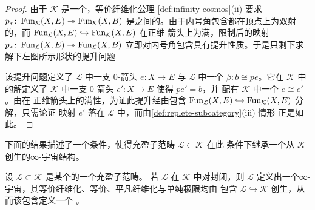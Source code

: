 \begin{proof}
由于 $\mathcal{K}$ 是一个\trInfinityCosmos{}，等价纤维化公理
\cref{def:infinity-cosmos}(ii) 要求
$p_{*}\colon\operatorname{Fun}_{\mathcal{K}}(X,E)\twoheadrightarrow\operatorname{Fun}_{\mathcal{K}}(X,B)$
是\trQuasiCategory{}之间的\trIsofibration{}。由于内号角包含都在顶点上为双射
的，而 $\operatorname{Fun}_{\mathcal{L}}(X,E)\hookrightarrow\operatorname{Fun}_{\mathcal{K}}(X,E)$ 在正维
箭头上为满，限制后的映射
$p_{*}\colon\operatorname{Fun}_{\mathcal{L}}(X,E)\twoheadrightarrow\operatorname{Fun}_{\mathcal{L}}(X,B)$
立即对内号角包含具有提升性质。于是只剩下求解下左图所示形状的提升问题
\begin{center}
\end{center}
该提升问题定义了 $\mathcal{L}$ 中一支 0-箭头 $e\colon X\to E$ 与 $\mathcal{L}$
中一个\trHomotopyCoherentIsomorphism{} $\beta\colon b\cong pe$。它在 $\mathcal{K}$
中的解定义了 $\mathcal{K}$ 中一支 0-箭头 $e'\colon X\to E$ 使得 $pe'=b$，并
配有 $\mathcal{K}$ 中一个\trHomotopyCoherentIsomorphism{} $e\cong e'$。由在
正维箭头上的满性，为证此提升经由包含
$\operatorname{Fun}_{\mathcal{L}}(X,E)\hookrightarrow\operatorname{Fun}_{\mathcal{K}}(X,E)$ 分解，只需论证
映射 $e'$ 落在 $\mathcal{L}$ 中，而由\cref{def:replete-subcategory}(iii) 情形
正是如此。
\end{proof}

下面的结果描述了一个条件，使得充盈子范畴 $\mathcal{L}\subset\mathcal{K}$ 在此
条件下继承一个从 $\mathcal{K}$ 创生的∞-宇宙结构。

\begin{proposition}\label{prop:cosmologically-embedded}
设 $\mathcal{L}\subset\mathcal{K}$ 是某个\trInfinityCosmos{}的一个充盈子范畴。
若 $\mathcal{L}$ 在 $\mathcal{K}$ 中对\trFlexibleWeightedLimit{}封闭，则
$\mathcal{L}$ 定义出一个∞-宇宙，其等价纤维化、等价、平凡纤维化与单纯极限均由
包含 $\mathcal{L}\hookrightarrow\mathcal{K}$ 创生，从而该包含定义一个%
\trCosmologicalFunctor{}。
\end{proposition}

